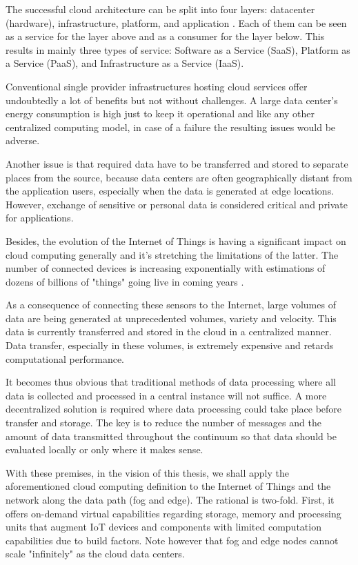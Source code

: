 \documentclass{ieeeaccess}
\begin{document}
The successful cloud architecture can be split into four layers: datacenter (hardware), infrastructure, platform, and application \cite{cloud-computing}. Each of them can be seen as a service for the layer above and as a consumer for the layer below. This results in mainly three types of service: Software as a Service (SaaS), Platform as a Service (PaaS), and Infrastructure as a Service (IaaS).

Conventional single provider infrastructures hosting cloud services offer undoubtedly a lot of benefits but not without challenges. A large data center’s energy consumption is high just to keep it operational and like any other centralized computing model, in case of a failure the resulting issues would be adverse.

Another issue is that required data have to be transferred and stored to separate places from the source, because data centers are often geographically distant from the application users, especially when the data is generated at edge locations. However, exchange of sensitive or personal data is considered critical and private for applications.

Besides, the evolution of the Internet of Things is having a significant impact on cloud computing generally and it's stretching the limitations of the latter. The number of connected devices is increasing exponentially with estimations of dozens of billions of "things" going live in coming years \cite{gartner-iot}.

As a consequence of connecting these sensors to the Internet, large volumes of data are being generated at unprecedented volumes, variety and velocity. This data is currently transferred and stored in the cloud in a centralized manner. Data transfer, especially in these volumes, is extremely expensive and retards computational performance.

It becomes thus obvious that traditional methods of data processing where all data is collected and processed in a central instance will not suffice. A more decentralized solution is required where data processing could take place before transfer and storage. The key is to reduce the number of messages and the amount of data transmitted throughout the continuum so that data should be evaluated locally or only where it makes sense.

With these premises, in the vision of this thesis, we shall apply the aforementioned cloud computing definition to the Internet of Things and the network along the data path (fog and edge). The rational is two-fold. First, it offers on-demand virtual capabilities regarding storage, memory and processing units that augment IoT devices and components with limited computation capabilities due to build factors. Note however that fog and edge nodes cannot scale "infinitely" as the cloud data centers.
\end{document}
